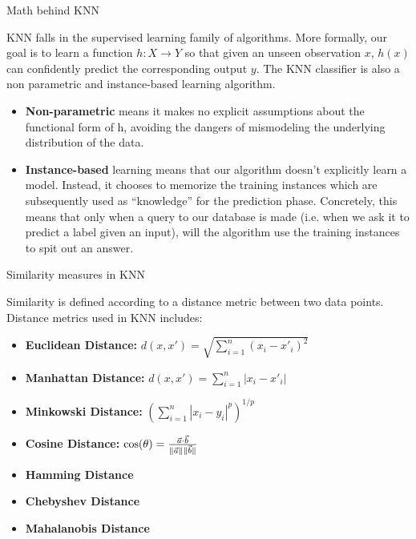 \documentclass{beamer}
\begin{document}
\begin{frame}{Math behind KNN}
	\begin{flushleft}
		KNN falls in the supervised learning family of algorithms. More formally, our goal is to learn a function $h:X \rightarrow Y$ so that given an unseen observation $x$, $h(x)$ can confidently predict the corresponding output $y$.
		The KNN classifier is also a non parametric and instance-based learning algorithm.
\begin{itemize}
	\item \textbf{Non-parametric} means it makes no explicit assumptions about the functional form of h, avoiding the dangers of mismodeling the underlying distribution of the data.
	\item \textbf{Instance-based} learning means that our algorithm doesn’t explicitly learn a model. Instead, it chooses to memorize the training instances which are subsequently used as “knowledge” for the prediction phase. Concretely, this means that only when a query to our database is made (i.e. when we ask it to predict a label given an input), will the algorithm use the training instances to spit out an answer.
\end{itemize}
	\end{flushleft}
\end{frame}
\begin{frame}{Similarity measures in KNN}
	\begin{flushleft}
	Similarity is defined according to a distance metric between two data points. Distance metrics used in KNN includes:
		\begin{itemize}
			\item \textbf{Euclidean Distance: } $ d(x, x') = \sqrt{\sum\limits_{i=1}^n{\left(x_i - x'_i \right)^2}}$
			\item \textbf{Manhattan Distance: } $ d(x, x') = \sum\limits_{i=1}^n{|x_i - x'_i|}$
			\item \textbf{Minkowski Distance: } $ (\sum\limits_{i=1}^n{|x_i - y_i|^p})^{1/p}$
			\item \textbf{Cosine Distance: } $ \cos(\theta )={\vec{a} \cdot \vec{b}  \over \|\vec{a} \|\|\vec{b} \|}$
			\item \textbf{Hamming Distance}
			\item \textbf{Chebyshev Distance}
			\item \textbf{Mahalanobis Distance}
		\end{itemize}
	\end{flushleft}
\end{frame}
\end{document}
